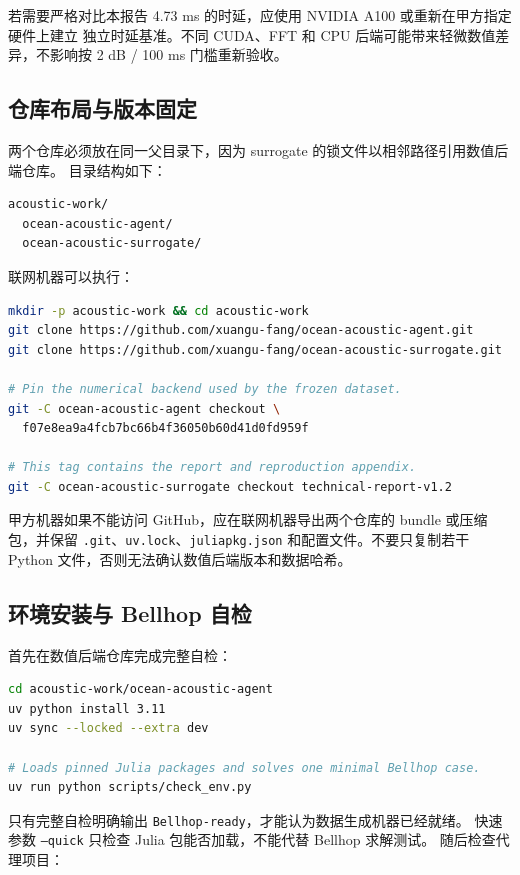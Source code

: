 \documentclass[UTF8,11pt]{ctexart}
\begin{document}
若需要严格对比本报告 4.73 ms 的时延，应使用 NVIDIA A100 或重新在甲方指定硬件上建立
独立时延基准。不同 CUDA、FFT 和 CPU 后端可能带来轻微数值差异，不影响按 2 dB / 100 ms
门槛重新验收。

\subsection{仓库布局与版本固定}

两个仓库必须放在同一父目录下，因为 surrogate 的锁文件以相邻路径引用数值后端仓库。
目录结构如下：

\begin{lstlisting}[style=repro,language=bash]
acoustic-work/
  ocean-acoustic-agent/
  ocean-acoustic-surrogate/
\end{lstlisting}

联网机器可以执行：

\begin{lstlisting}[style=repro,language=bash]
mkdir -p acoustic-work && cd acoustic-work
git clone https://github.com/xuangu-fang/ocean-acoustic-agent.git
git clone https://github.com/xuangu-fang/ocean-acoustic-surrogate.git

# Pin the numerical backend used by the frozen dataset.
git -C ocean-acoustic-agent checkout \
  f07e8ea9a4fcb7bc66b4f36050b60d41d0fd959f

# This tag contains the report and reproduction appendix.
git -C ocean-acoustic-surrogate checkout technical-report-v1.2
\end{lstlisting}

甲方机器如果不能访问 GitHub，应在联网机器导出两个仓库的 bundle 或压缩包，并保留
\texttt{.git}、\texttt{uv.lock}、\texttt{juliapkg.json} 和配置文件。不要只复制若干 Python
文件，否则无法确认数值后端版本和数据哈希。

\subsection{环境安装与 Bellhop 自检}

首先在数值后端仓库完成完整自检：

\begin{lstlisting}[style=repro,language=bash]
cd acoustic-work/ocean-acoustic-agent
uv python install 3.11
uv sync --locked --extra dev

# Loads pinned Julia packages and solves one minimal Bellhop case.
uv run python scripts/check_env.py
\end{lstlisting}

只有完整自检明确输出 \texttt{Bellhop-ready}，才能认为数据生成机器已经就绪。
快速参数 \texttt{--quick} 只检查 Julia 包能否加载，不能代替 Bellhop 求解测试。
随后检查代理项目：
\end{document}
